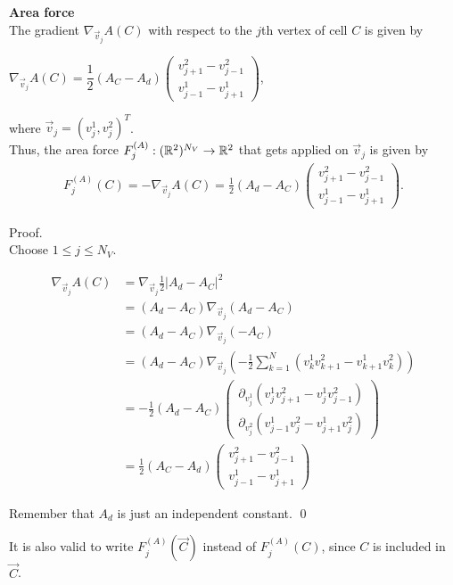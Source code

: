 \begin{proposition} \textbf{Area force} \label{force:area}\\
	The gradient $\nabla_{\vec{v}_j} A(C)$ with respect to the $j$th vertex of cell $C$ is given by 
	\begin{center}
		$\nabla_{\vec{v}_j} A(C) = \dfrac{1}{2} (A_{C} - A_d) \begin{pmatrix} v_{j+1}^{2} - v_{j-1}^{2} \\[0.5em]  v_{j-1}^{1} - v_{j+1}^{1} \end{pmatrix}$, 
	\end{center}
	where $\vec{v}_j = (v_{j}^{1}, v_{j}^{2})^T$. \\

	Thus, the area force $F_{j}^{(A)}: (\mathbb{R}^2)^{N_V} \rightarrow \mathbb{R}^2$ that gets applied on $\vec{v}_j$ is given by 
	\begin{align}
		F_{j}^{(A)}(C) 
		= - \nabla_{\vec{v}_j} A(C) 
		= \frac{1}{2}(A_d - A_{C}) \begin{pmatrix} v_{j+1}^{2} - v_{j-1}^{2} \\[0.5em]  v_{j-1}^{1} - v_{j+1}^{1} \end{pmatrix}.
	\end{align}



	Proof.\\
	Choose $1 \leq j \leq N_V$.  
 
	\begin{align*}
		\nabla_{\vec{v}_j} A(C) &= \nabla_{\vec{v}_j} \frac{1}{2} | A_d - A_{C} |^2  \\ 
		&=  (A_d - A_{C}) \nabla_{\vec{v}_j} (A_d - A_{C}) \\
		&=   (A_d - A_{C}) \nabla_{\vec{v}_j} ( - A_{C}) \\ 
		&=   (A_d - A_{C}) \nabla_{\vec{v}_j} ( - \frac{1}{2} \sum\limits_{k = 1}^{N} (v_k^1 v_{k+1}^2 - v_{k+1}^1 v_k^2)) \\[0.5em]  
		&=   - \frac{1}{2} (A_d - A_{C}) \begin{pmatrix}
			\partial_{v_j^1} (v_j^1 v_{j+1}^2 - v_j^1 v_{j-1}^2)  \\[0.5em]
			\partial_{v_j^2} (v_{j-1}^1 v_j^2 - v_{j+1}^1 v_j^2)
		\end{pmatrix} \\[0.5em] 
		&=   \frac{1}{2} (A_{C} - A_d) \begin{pmatrix}
			  v_{j+1}^2 - v_{j-1}^2  \\
			 v_{j-1}^1  - v_{j+1}^1 
		\end{pmatrix} 
	\end{align*}

	Remember that $A_d$ is just an independent constant. 
	\qed
\end{proposition}
It is also valid to write $F_{j}^{(A)}(\vec{C})$ instead of $F_{j}^{(A)}(C)$, since $C$ is included in $\vec{C}$. 


